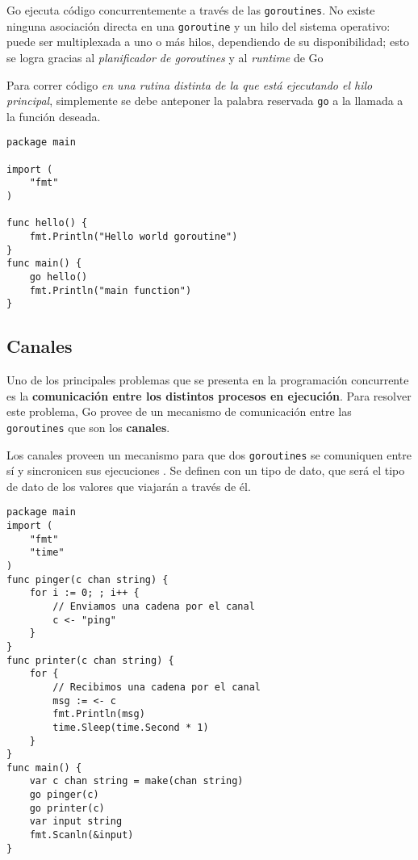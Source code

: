 Go ejecuta código concurrentemente a través de las \texttt{goroutines}. No existe ninguna asociación directa en una \texttt{goroutine} y un hilo del sistema operativo: puede ser multiplexada a uno o más hilos, dependiendo de su disponibilidad; esto se logra gracias al \emph{planificador de goroutines} y al \emph{runtime} de Go \autocite{TheWayToGo:Goroutines}    

Para correr código \emph{en una rutina distinta de la que está ejecutando el hilo principal}, simplemente se debe anteponer la palabra reservada \texttt{go} a la llamada a la función deseada.

\vspace*{5mm}
\begin{lstlisting}[title={Ejecución concurrente con \texttt{goroutines} \autocite{GolangBotGoroutines}}]
package main

import (  
    "fmt"
)

func hello() {  
    fmt.Println("Hello world goroutine")
}
func main() {  
    go hello()
    fmt.Println("main function")
}
\end{lstlisting}


\subsection{Canales}

Uno de los principales problemas que se presenta en la programación concurrente es la \textbf{comunicación entre los distintos procesos en ejecución}. Para resolver este problema, Go provee de un mecanismo de comunicación entre las \texttt{goroutines} que son los \textbf{canales}. 

Los canales proveen un mecanismo para que dos \texttt{goroutines} se comuniquen entre sí y sincronicen sus ejecuciones \autocite{AnIntroductionToProgrammingInGo:Concurrency}. Se definen con un tipo de dato, que será el tipo de dato de los valores que viajarán a través de él.

\vspace*{5mm}
\begin{lstlisting}[title={Dos \texttt{goroutines} que se comunican a través de un canal de cadenas \autocite{AnIntroductionToProgrammingInGo:Concurrency}}]
package main
import (
    "fmt"
    "time"
)
func pinger(c chan string) {
    for i := 0; ; i++ {
        // Enviamos una cadena por el canal
        c <- "ping"
    }
}
func printer(c chan string) {
    for {
        // Recibimos una cadena por el canal
        msg := <- c
        fmt.Println(msg)
        time.Sleep(time.Second * 1)
    }
}
func main() {
    var c chan string = make(chan string)
    go pinger(c)
    go printer(c)
    var input string
    fmt.Scanln(&input)
}
\end{lstlisting}

